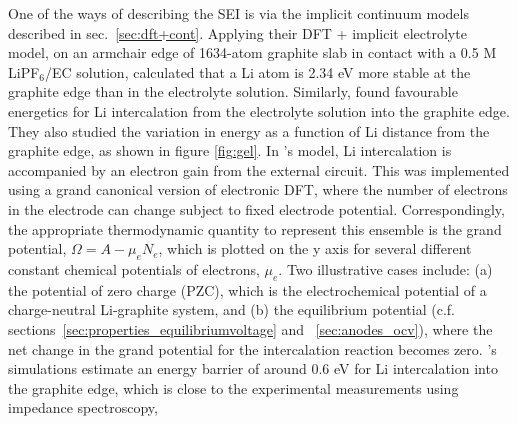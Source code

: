 \documentclass[../main.tex]{subfiles}
\begin{document}
One of the ways of describing the SEI is via the implicit continuum models described in sec.~\ref{sec:dft+cont}. Applying their DFT + implicit electrolyte model, on an armchair edge of 1634-atom graphite slab in contact with a 0.5 M LiPF$_6$/EC solution, \citeauthor{Dziedzic2020} calculated that a Li atom is 2.34 eV more stable at the graphite edge than in the electrolyte solution.\cite{Dziedzic2020} Similarly, \citeauthor{haruyama2018} found favourable energetics for Li intercalation from the electrolyte solution into the graphite edge.\cite{haruyama2018} They also studied the variation in energy as a function of Li distance from the graphite edge, as shown in figure \ref{fig:gel}. In \citeauthor{haruyama2018}'s model, Li intercalation is accompanied by an electron gain from the external circuit. This was implemented using a grand canonical version of electronic DFT, where the number of electrons in the electrode can change subject to fixed electrode potential. Correspondingly, the appropriate thermodynamic quantity to represent this ensemble is the grand potential, $\Omega=A-\mu_e N_e$, which is plotted on the y axis for several different constant chemical potentials of electrons, $\mu_e$. Two illustrative cases include: (a) the potential of zero charge (PZC), which is the electrochemical potential of a charge-neutral Li-graphite system, and (b) the equilibrium potential (c.f.  sections~\ref{sec:properties_equilibriumvoltage} and ~\ref{sec:anodes_ocv}), where the net change in the grand potential for the intercalation reaction becomes zero. \citeauthor{haruyama2018}'s simulations estimate an energy barrier of around 0.6 eV for Li intercalation into the graphite edge, which is close to the experimental measurements using impedance spectroscopy,\cite{Yamada2009}
\end{document}
